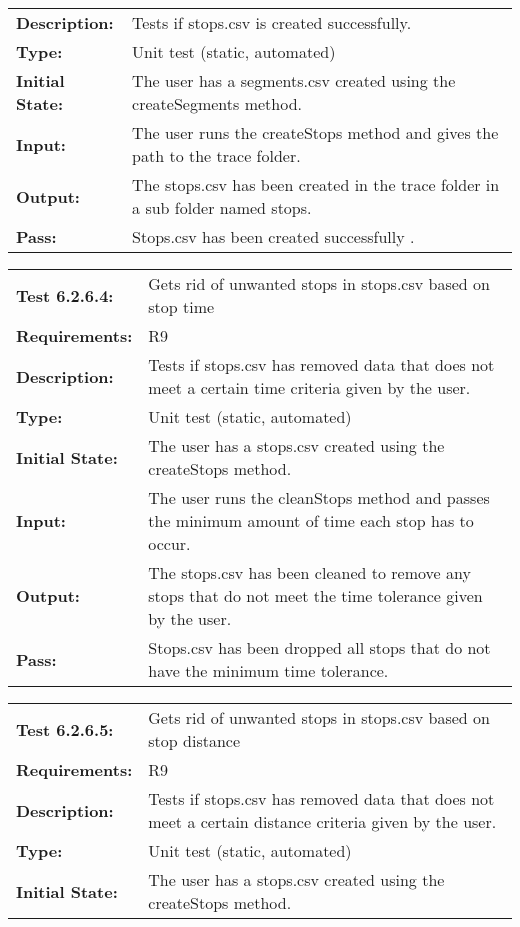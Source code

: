\documentclass[12pt, titlepage]{article}
\begin{document}
{\begin{tabular}{|l|p{10cm}|}
    \bf{Description}: & Tests if stops.csv is created successfully. \\
    \bf{Type}: & Unit test (static, automated) \\
    \bf{Initial State}: & The user has a segments.csv created using the createSegments method. \\
    \bf{Input}: & The user runs the createStops method and gives the path to the trace folder. \\
    \bf{Output}: & The stops.csv has been created in the trace folder in a sub folder named stops. \\
    \bf{Pass}: & Stops.csv has been created successfully . \\
    \hline
\end{tabular}
\begin{tabular}{|l|p{10cm}|}
    \hline
    \bf{Test} 6.2.6.4: & Gets rid of unwanted stops in stops.csv based on stop time \\
    \bf{Requirements}: &  R9\\
    \bf{Description}: & Tests if stops.csv  has removed data that does not meet a certain time criteria given by the user. \\
    \bf{Type}: & Unit test (static, automated) \\
    \bf{Initial State}: & The user has a stops.csv created using the createStops method. \\
    \bf{Input}: & The user runs the cleanStops method and passes the minimum amount of time each stop has to occur. \\
    \bf{Output}: & The stops.csv has been cleaned to remove any stops that do not meet the time tolerance given by the user. \\
    \bf{Pass}: & Stops.csv has been dropped all stops that do not have the minimum time tolerance. \\
    \hline
\end{tabular}
\begin{tabular}{|l|p{10cm}|}
    \hline
    \bf{Test} 6.2.6.5: & Gets rid of unwanted stops in stops.csv based on stop distance \\
    \bf{Requirements}: &  R9\\
    \bf{Description}: & Tests if stops.csv  has removed data that does not meet a certain distance criteria given by the user. \\
    \bf{Type}: & Unit test (static, automated) \\
    \bf{Initial State}: & The user has a stops.csv created using the createStops method. \\

\end{tabular}}
\end{document}
